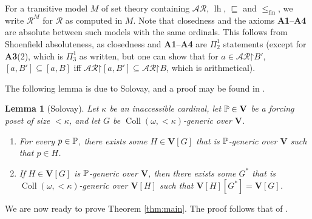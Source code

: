 \documentclass[10pt,a4paper]{amsart}
\theoremstyle{plain}
\numberwithin{equation}{section}
\newtheorem{lemma}[theorem]{Lemma}
\theoremstyle{definition}
\newcommand{\func}{\operatorname}
\newcommand{\cal}{\mathcal}
\renewcommand{\bf}{\mathbf}
\newcommand{\restrictedto}{\mathord{\upharpoonright}}
\newcommand{\Coll}{\func{Coll}}
\newcommand{\V}{\bf{V}}
\newcommand{\lh}{\func{lh}}
\newcommand{\fin}{\mathrm{fin}}
\DeclareRobustCommand{\P}{\ifmmode\mathbb{P}\else\pilcrowP\fi}
\begin{document}
For a transitive model $M$ of set theory containing $\cal{AR}$, $\lh$, $\sqsubseteq$ and $\leq_\fin$, we write $\cal{R}^M$ for $\cal{R}$ as computed in $M$. Note that closedness and the axioms \textbf{A1}--\textbf{A4} are absolute between such models with the same ordinals. This follows from Shoenfield absoluteness, as closedness and \textbf{A1}--\textbf{A4} are $\Pi_2^1$ statements (except for \textbf{A3}(2), which is $\Pi_3^1$ as written, but one can show that for $a \in \cal{AR}\restrictedto B'$, $[a,B'] \subseteq [a,B]$ iff $\cal{AR}\restrictedto[a,B'] \subseteq \cal{AR}\restrictedto B$, which is arithmetical).

The following lemma is due to Solovay, and a proof may be found in \cite{Sol70}.

\begin{lemma}[Solovay]
\label{lem:Solovay}
    Let $\kappa$ be an inaccessible cardinal, let $\P \in \V$ be a forcing poset of size $<\kappa$, and let $G$ be $\Coll(\omega,{<}\kappa)$-generic over $\V$.
    \begin{enumerate}
        \item For every $p \in \P$, there exists some $H \in \V[G]$ that is $\P$-generic over $\V$ such that $p \in H$.

        \item If $H \in \V[G]$ is $\P$-generic over $\V$, then there exists some $G^*$ that is $\Coll(\omega,{<}\kappa)$-generic over $\V[H]$ such that $\V[H][G^*] = \V[G]$.
    \end{enumerate}
\end{lemma}

We are now ready to prove Theorem \ref{thm:main}. The proof follows that of \cite[Theorem 1.7]{Y25}.
\end{document}
